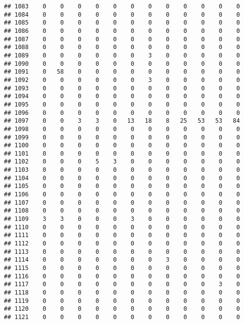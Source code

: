 \documentclass[]{article}
\begin{document}
\begin{verbatim}
## 1083    0    0    0    0    0    0    0    0    0    0    0    0
## 1084    0    0    0    0    0    0    0    0    0    0    0    0
## 1085    0    0    0    0    0    0    0    0    0    0    0    0
## 1086    0    0    0    0    0    0    0    0    0    0    0    0
## 1087    0    0    0    0    0    0    0    0    0    0    0    0
## 1088    0    0    0    0    0    0    0    0    0    0    0    0
## 1089    0    0    0    0    0    0    3    0    0    0    0    0
## 1090    0    0    0    0    0    0    0    0    0    0    0    0
## 1091    0   58    0    0    0    0    0    0    0    0    0    0
## 1092    0    0    0    0    0    0    3    0    0    0    0    0
## 1093    0    0    0    0    0    0    0    0    0    0    0    0
## 1094    0    0    0    0    0    0    0    0    0    0    0    0
## 1095    0    0    0    0    0    0    0    0    0    0    0    0
## 1096    0    0    0    0    0    0    0    0    0    0    0    0
## 1097    0    0    3    3    0   13   18    8   25   53   53   84
## 1098    0    0    0    0    0    0    0    0    0    0    0    0
## 1099    0    0    0    0    0    0    0    0    0    0    0    0
## 1100    0    0    0    0    0    0    0    0    0    0    0    0
## 1101    0    0    0    0    0    0    0    0    0    0    0    0
## 1102    0    0    0    5    3    0    0    0    0    0    0    0
## 1103    0    0    0    0    0    0    0    0    0    0    0    0
## 1104    0    0    0    0    0    0    0    0    0    0    0    0
## 1105    0    0    0    0    0    0    0    0    0    0    0    0
## 1106    0    0    0    0    0    0    0    0    0    0    0    0
## 1107    0    0    0    0    0    0    0    0    0    0    0    0
## 1108    0    0    0    0    0    0    0    0    0    0    0    0
## 1109    3    3    0    0    0    3    0    0    0    0    0    0
## 1110    0    0    0    0    0    0    0    0    0    0    0    0
## 1111    0    0    0    0    0    0    0    0    0    0    0    0
## 1112    0    0    0    0    0    0    0    0    0    0    0    0
## 1113    0    0    0    0    0    0    0    0    0    0    0    0
## 1114    0    0    0    0    0    0    0    3    0    0    0    0
## 1115    0    0    0    0    0    0    0    0    0    0    0    0
## 1116    0    0    0    0    0    0    0    0    0    0    0    0
## 1117    0    0    0    0    0    0    0    0    0    0    3    0
## 1118    0    0    0    0    0    0    0    0    0    0    0    0
## 1119    0    0    0    0    0    0    0    0    0    0    0    0
## 1120    0    0    0    0    0    0    0    0    0    0    0    0
## 1121    0    0    0    0    0    0    0    0    0    0    0    0

\end{verbatim}
\end{document}
